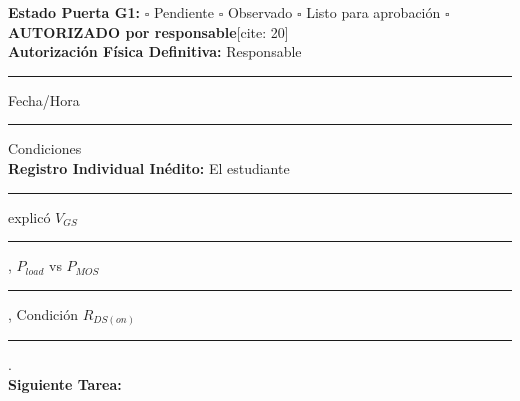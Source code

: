 \documentclass[10pt, a4paper, landscape]{article}
\begin{document}
\vspace{0.5cm}
\begin{tcolorbox}[colback=white, colframe=black, title=\textbf{Declaración de Puerta de Seguridad G1 y Registro Individual[cite: 20]}]
    \textbf{Estado Puerta G1:} $\square$ Pendiente \quad $\square$ Observado \quad $\square$ Listo para aprobación \quad $\square$ \textbf{AUTORIZADO por responsable}[cite: 20] \\[0.3cm]
    \textbf{Autorización Física Definitiva:} Responsable \rule{4cm}{0.15mm} \quad Fecha/Hora \rule{3cm}{0.15mm} \quad Condiciones \hrulefill \\[0.3cm]
    \textbf{Registro Individual Inédito:} El estudiante \rule{4cm}{0.15mm} explicó $V_{GS}$ \rule{1cm}{0.15mm}, $P_{load}$ vs $P_{MOS}$ \rule{1cm}{0.15mm}, Condición $R_{DS(on)}$ \rule{1cm}{0.15mm}. \\[0.1cm]
    \textbf{Siguiente Tarea:} \hrulefill
\end{tcolorbox}
\end{document}

